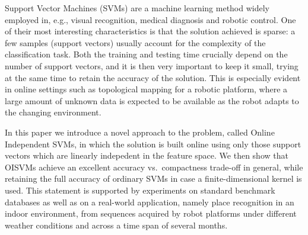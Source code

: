 Support Vector Machines (SVMs) are a machine learning method widely
employed in, e.g., visual recognition, medical diagnosis and robotic
control. One of their most interesting characteristics is that the
solution achieved is sparse: a few samples (support vectors) usually
account for the complexity of the classification task. Both the
training and testing time crucially depend on the number of support
vectors, and it is then very important to keep it small, trying at the
same time to retain the accuracy of the solution. This is especially
evident in online settings such as topological mapping for a robotic
platform, where a large amount of unknown data is expected to be
available as the robot adapts to the changing environment.

In this paper we introduce a novel approach to the problem, called
Online Independent SVMs, in which the solution is built online using
only those support vectors which are linearly indepedent in the
feature space. We then show that OISVMs achieve an excellent accuracy
vs.~compactness trade-off in general, while retaining the full
accuracy of ordinary SVMs in case a finite-dimensional kernel is
used. This statement is supported by experiments on standard benchmark
databases as well as on a real-world application, namely place
recognition in an indoor environment, from sequences acquired by robot
platforms under different weather conditions and across a time span of
several months.
